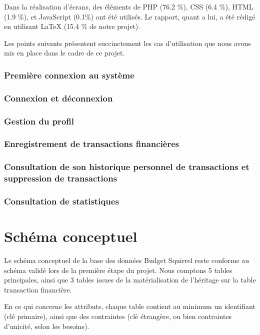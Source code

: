 \documentclass[a4paper,12pt]{article}
\begin{document}
Dans la réalisation d'écrans, des éléments de PHP (76.2 \%), CSS (6.4 \%), HTML (1.9 \%),  et JavaScript (0.1\%) ont été utilisés. Le rapport, quant a lui, a été rédigé en utilisant LaTeX (15.4 \% de notre projet).

Les points suivants présentent succinctement les cas d'utilisation que nous avons mis en place dans le cadre de ce projet.

\subsubsection{Première connexion au système}

\subsubsection{Connexion et déconnexion}

\subsubsection{Gestion du profil}

\subsubsection{Enregistrement de transactions financières}

\subsubsection{Consultation de son historique personnel de transactions et suppression de transactions}

\subsubsection{Consultation de statistiques}

\newpage

\section{Schéma conceptuel}

Le schéma conceptuel de la base des données Budget Squirrel reste conforme au schéma validé lors de la première étape du projet. Nous comptons 5 tables principales, ainsi que 3 tables issues de la matérialisation de l’héritage sur la table transaction financière.

En ce qui concerne les attributs, chaque table contient au minimum un identifiant (clé primaire), ainsi que des contraintes (clé étrangère, ou bien contraintes d'unicité, selon les besoins).
\end{document}
